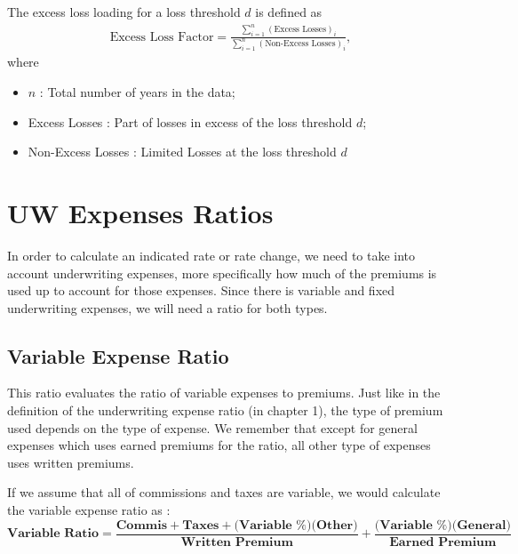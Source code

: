 \documentclass[11pt, english]{memoir}
\numberwithin{definition}{section}
\begin{document}
The excess loss loading for a loss threshold $ d $ is defined as 
\begin{align*}
\text{Excess Loss Factor} = \frac{\sum_{i= 1}^{n}(\text{Excess Losses})_{i}}{\sum_{i = 1}^{n}(\text{Non-Excess Losses})_{i}},
\end{align*}
where
\begin{itemize}
	\item $ n $ : Total number of years in the data;
	\item Excess Losses : Part of losses in excess of the loss threshold $ d $;
	\item Non-Excess Losses : Limited Losses at the loss threshold $ d $
\end{itemize}









	
	
\chapter{UW Expenses Ratios}	

In order to calculate an indicated rate or rate change, we need to take into account underwriting expenses, more specifically how much of the premiums is used up to account for those expenses. Since there is variable and fixed underwriting expenses, we will need a ratio for both types.

\section{Variable Expense Ratio}

	This ratio evaluates the ratio of variable expenses to premiums. Just like in the definition of the underwriting expense ratio (in chapter 1), the type of premium used depends on the type of expense. We remember that except for general expenses which uses earned premiums for the ratio, all other type of expenses uses written premiums. 
		
	If we assume that all of commissions and taxes are variable, we would calculate the variable expense ratio as :
	\begin{equation*}
		\textbf{Variable Ratio} = \frac{\textbf{Commis} + \textbf{Taxes} + (\textbf{Variable \% )(Other)}}{\textbf{Written Premium}} +\frac{\textbf{(Variable \%)(General)}}{\textbf{Earned Premium}} 
	\end{equation*}
	
\end{document}
